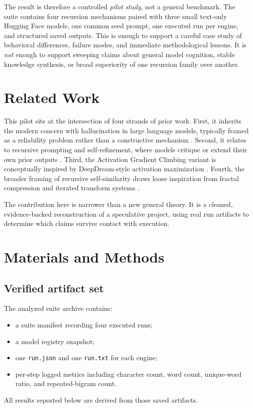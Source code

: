 \documentclass[11pt]{article}
\begin{document}
The result is therefore a controlled \emph{pilot study}, not a general benchmark. The suite contains four recursion mechanisms paired with three small text-only Hugging Face models, one common seed prompt, one executed run per engine, and structured saved outputs. This is enough to support a careful case study of behavioral differences, failure modes, and immediate methodological lessons. It is \emph{not} enough to support sweeping claims about general model cognition, stable knowledge synthesis, or broad superiority of one recursion family over another.

\section{Related Work}
This pilot sits at the intersection of four strands of prior work. First, it inherits the modern concern with hallucination in large language models, typically framed as a reliability problem rather than a constructive mechanism \cite{ji2023survey,maynez2020faithfulness}. Second, it relates to recursive prompting and self-refinement, where models critique or extend their own prior outputs \cite{wei2022cot,madaan2023selfrefine}. Third, the Activation Gradient Climbing variant is conceptually inspired by DeepDream-style activation maximization \cite{mordvintsev2015inceptionism}. Fourth, the broader framing of recursive self-similarity draws loose inspiration from fractal compression and iterated transform systems \cite{jacquin1992fractal}. 

The contribution here is narrower than a new general theory. It is a cleaned, evidence-backed reconstruction of a speculative project, using real run artifacts to determine which claims survive contact with execution.

\section{Materials and Methods}

\subsection{Verified artifact set}
The analyzed suite archive contains:
\begin{itemize}[leftmargin=1.5em]
    \item a suite manifest recording four executed runs;
    \item a model registry snapshot;
    \item one \texttt{run.json} and one \texttt{run.txt} for each engine;
    \item per-step logged metrics including character count, word count, unique-word ratio, and repeated-bigram count.
\end{itemize}
All results reported below are derived from those saved artifacts.
\end{document}
